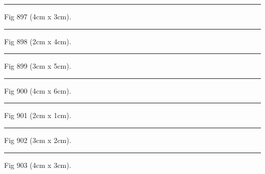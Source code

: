 \documentclass[a4paper,11pt]{article}
\begin{document}
\begin{swarmwrap}%
  \begin{minipage}[t]{4cm}
    \centering
    \rule{\linewidth}{3cm}
    {\footnotesize Fig 897 (4cm x 3cm).}
  \end{minipage}%
\end{swarmwrap}%
\swarmwrapnext
\lipsum[147]%

\begin{swarmwrap}%
  \begin{minipage}[t]{2cm}
    \centering
    \rule{\linewidth}{4cm}
    {\footnotesize Fig 898 (2cm x 4cm).}
  \end{minipage}%
\end{swarmwrap}%
\swarmwrapnext
\lipsum[148]%

\begin{swarmwrap}%
  \begin{minipage}[t]{3cm}
    \centering
    \rule{\linewidth}{5cm}
    {\footnotesize Fig 899 (3cm x 5cm).}
  \end{minipage}%
\end{swarmwrap}%
\swarmwrapnext
\lipsum[149]%

\begin{swarmwrap}%
  \begin{minipage}[t]{4cm}
    \centering
    \rule{\linewidth}{6cm}
    {\footnotesize Fig 900 (4cm x 6cm).}
  \end{minipage}%
\end{swarmwrap}%
\swarmwrapnext
\lipsum[150]%

\begin{swarmwrap}%
  \begin{minipage}[t]{2cm}
    \centering
    \rule{\linewidth}{1cm}
    {\footnotesize Fig 901 (2cm x 1cm).}
  \end{minipage}%
\end{swarmwrap}%
\swarmwrapnext
\lipsum[1]%

\begin{swarmwrap}%
  \begin{minipage}[t]{3cm}
    \centering
    \rule{\linewidth}{2cm}
    {\footnotesize Fig 902 (3cm x 2cm).}
  \end{minipage}%
\end{swarmwrap}%
\swarmwrapnext
\lipsum[2]%

\begin{swarmwrap}%
  \begin{minipage}[t]{4cm}
    \centering
    \rule{\linewidth}{3cm}
    {\footnotesize Fig 903 (4cm x 3cm).}
  \end{minipage}%
\end{swarmwrap}%
\swarmwrapnext
\lipsum[3]%
\end{document}
